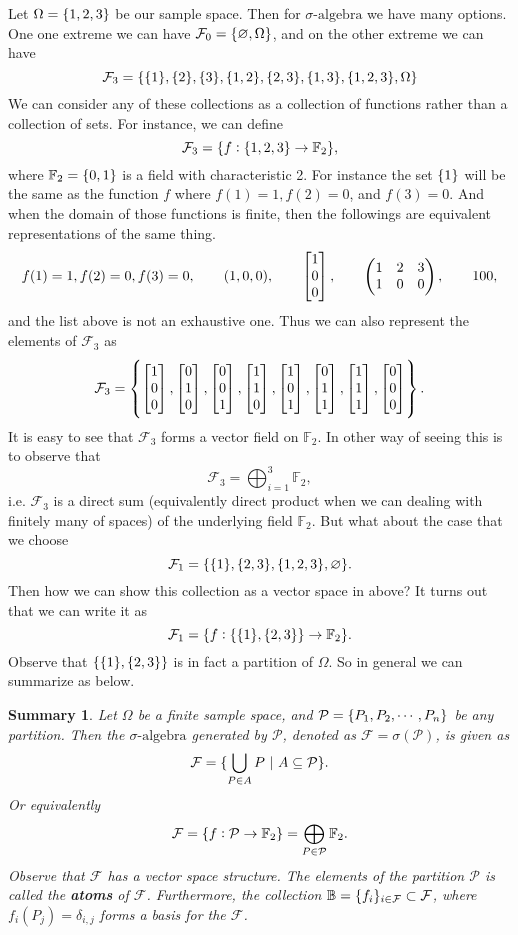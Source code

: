\documentclass[11pt,a4paper]{article}
\newtheorem*{summary}{Summary}
\theoremstyle{definition}
\begin{document}
	Let $ \Omega = \{1,2,3\} $ be our sample space. Then for $\sigma\text{-algebra}$ we have many options. One one extreme we can have $ \mathcal{F}_0 = \{\varnothing, \Omega\} $, and on the other extreme we can have 
	\[ \mathcal{F}_3 = \{\{1\},\{2\},\{3\},\{1,2\},\{2,3\},\{1,3\},\{1,2,3\}, \Omega\} \]
	We can consider any of these collections as a collection of functions rather than a collection of sets. For instance, we can define
	\[ \mathcal{F}_3 = \{f:\{1,2,3\}\to \mathbb{F}_2\}, \]
	where $ \mathbb{F}_2 = \{0,1\} $ is a field with characteristic 2. For instance the set $ \{1\} $ will be the same as the function $ f $ where $ f(1) = 1, f(2)=0$, and $f(3) = 0 $. And when the domain of those functions is finite, then the followings are equivalent representations of the same thing.
	\[ f(1)=1,f(2)=0,f(3)=0, \qquad (1,0,0), \qquad \begin{bmatrix} 1 \\ 0 \\ 0 \end{bmatrix}, \qquad \begin{pmatrix}
		1 & 2 & 3 \\
		1 & 0 & 0 
	\end{pmatrix}, \qquad 100,  \]
	and the list above is not an exhaustive one. Thus we can also represent the elements of $ \mathcal{F}_3 $ as 
	\[ \mathcal{F}_3 = \left\{\begin{bmatrix} 1 \\ 0 \\ 0 \end{bmatrix}, \begin{bmatrix} 0 \\ 1 \\ 0 \end{bmatrix}, \begin{bmatrix} 0 \\ 0 \\ 1 \end{bmatrix},\begin{bmatrix} 1 \\ 1 \\ 0 \end{bmatrix}, \begin{bmatrix} 1 \\ 0 \\ 1 \end{bmatrix}, \begin{bmatrix} 0 \\ 1 \\ 1 \end{bmatrix},\begin{bmatrix} 1 \\ 1 \\ 1 \end{bmatrix},\begin{bmatrix} 0 \\ 0 \\ 0 \end{bmatrix} \right\}. \]	
	It is easy to see that $ \mathcal{F}_3 $ forms a vector field on $ \mathbb{F}_2 $. In other way of seeing this is to observe that 
	\[ \mathcal{F}_3 = \bigoplus_{i=1}^3 \mathbb{F}_2, \]
	i.e. $ \mathcal{F}_3 $ is a direct sum (equivalently direct product when we can dealing with finitely many of spaces)  of the underlying field $ \mathbb{F}_2 $.
	But what about the case that we choose
	\[ \mathcal{F}_1 = \{\{1\},\{2,3\},\{1,2,3\},\varnothing\}. \]
	Then how we can show this collection as a vector space in above? It turns out that we can write it as
	\[ \mathcal{F}_1 = \{f: \{\{1\},\{2,3\}\} \to \mathbb{F}_2\}. \]
	Observe that $ \{\{1\},\{2,3\}\} $ is in fact a partition of $ \Omega $. So in general we can summarize as below.
	
	\begin{summary}
		Let $ \Omega $ be a finite sample space, and $ \mathcal{P} = \{P_1,P_2,\cdots,P_n\} $ be any partition. Then the $\sigma\text{-algebra}$ generated by $ \mathcal{P} $, denoted as $ \mathcal{F} = \sigma(\mathcal{P}) $, is given as
		\[ \mathcal{F} = \{\bigcup_{P\in A} P\ |\ A\subseteq \mathcal{P} \}. \]
		Or equivalently
		\[ \mathcal{F} = \{f: \mathcal{P} \to \mathbb{F}_2\} = \bigoplus_{P\in \mathcal{P}} \mathbb{F}_2. \]
		Observe that $ \mathcal{F} $ has a vector space structure. The elements of the partition $ \mathcal{P} $ is called the \textbf{atoms} of $ \mathcal{F} $. Furthermore, the collection $ \mathbb{B} = \{f_i\}_{i\in \mathcal{F}} \subset \mathcal{F} $, where $ f_i(P_j) = \delta_{i,j} $ forms a basis for the $ \mathcal{F} $.
	\end{summary}
	
\end{document}
